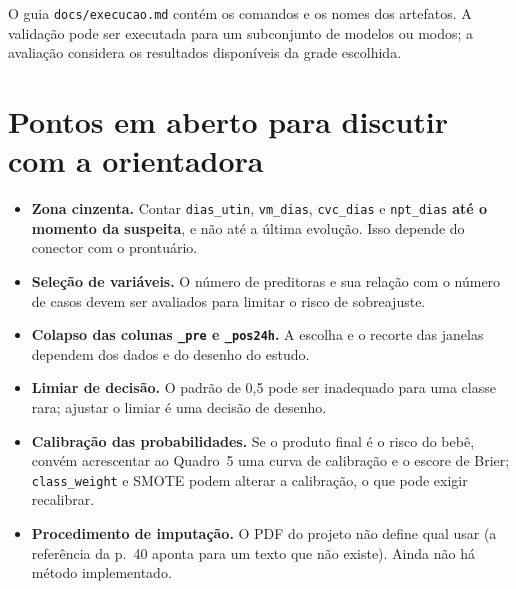 \documentclass[11pt,a4paper]{article}
\newcommand{\cod}[1]{\texttt{#1}}
\begin{document}
\begin{center}
\end{center}

O guia \cod{docs/execucao.md} contém os comandos e os nomes dos artefatos. A validação pode ser executada para um subconjunto de modelos ou modos; a avaliação considera os resultados disponíveis da grade escolhida.

\section{Pontos em aberto para discutir com a orientadora}

\begin{itemize}
  \item \textbf{Zona cinzenta.} Contar \cod{dias\_utin}, \cod{vm\_dias}, \cod{cvc\_dias} e \cod{npt\_dias} \textbf{até o momento da suspeita}, e não até a última evolução. Isso depende do conector com o prontuário.
  \item \textbf{Seleção de variáveis.} O número de preditoras e sua relação com o número de casos devem ser avaliados para limitar o risco de sobreajuste.
  \item \textbf{Colapso das colunas \cod{\_pre} e \cod{\_pos24h}.} A escolha e o recorte das janelas dependem dos dados e do desenho do estudo.
  \item \textbf{Limiar de decisão.} O padrão de 0,5 pode ser inadequado para uma classe rara; ajustar o limiar é uma decisão de desenho.
  \item \textbf{Calibração das probabilidades.} Se o produto final é o risco do bebê, convém acrescentar ao Quadro~5 uma curva de calibração e o escore de Brier; \cod{class\_weight} e SMOTE podem alterar a calibração, o que pode exigir recalibrar.
  \item \textbf{Procedimento de imputação.} O PDF do projeto não define qual usar (a referência da p.~40 aponta para um texto que não existe). Ainda não há método implementado.
\end{itemize}
\end{document}
